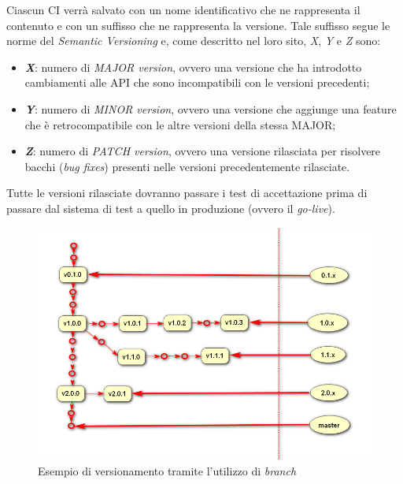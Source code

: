 	Ciascun CI verrà salvato con un nome identificativo che ne rappresenta il contenuto e con un suffisso che ne rappresenta la versione.
	Tale suffisso segue le norme del \textit{Semantic Versioning}\cite{semantic} e, come descritto nel loro sito, \textit{X}, \textit{Y} e \textit{Z} sono:
	
	\begin{itemize}[noitemsep]
		\item \textbf{\textit{X}}: numero di \textit{MAJOR version}, ovvero una versione che ha introdotto cambiamenti alle API che sono incompatibili con le versioni precedenti;
		\item \textit{\textbf{Y}}: numero di \textit{MINOR version}, ovvero una versione che aggiunge una feature che è retrocompatibile con le altre versioni della stessa MAJOR;
		\item \textit{\textbf{Z}}: numero di \textit{PATCH version}, ovvero una versione rilasciata per risolvere bacchi (\textit{bug fixes}) presenti nelle versioni precedentemente rilasciate.
	\end{itemize}
	
	Tutte le versioni rilasciate dovranno passare i test di accettazione prima di passare dal sistema di test a quello in produzione (ovvero il \textit{go-live}).
	
	\begin{figure}[h!]
		\centering
		\includegraphics[width=\linewidth]{img/branches.png}
		\caption{Esempio di versionamento tramite l'utilizzo di \textit{branch}}
		\label{fig:branches}
	\end{figure}

